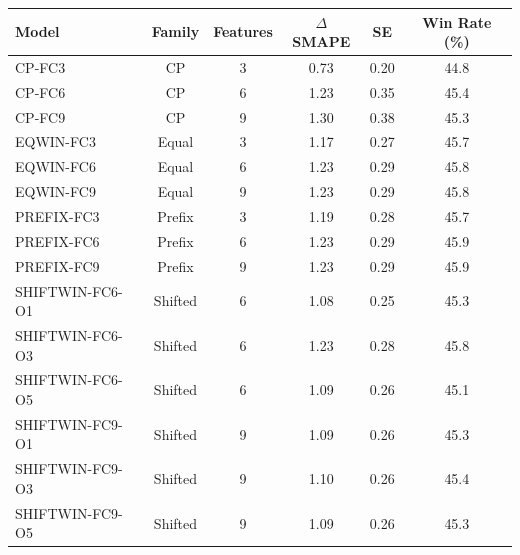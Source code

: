 \begin{tabular}{@{}lccccc@{}}
\toprule
Model & Family & Features & $\Delta$SMAPE & SE & Win Rate (\%) \\
\midrule
CP-FC3 & CP & 3 & 0.73 & 0.20 & 44.8 \\
CP-FC6 & CP & 6 & 1.23 & 0.35 & 45.4 \\
CP-FC9 & CP & 9 & 1.30 & 0.38 & 45.3 \\
EQWIN-FC3 & Equal & 3 & 1.17 & 0.27 & 45.7 \\
EQWIN-FC6 & Equal & 6 & 1.23 & 0.29 & 45.8 \\
EQWIN-FC9 & Equal & 9 & 1.23 & 0.29 & 45.8 \\
PREFIX-FC3 & Prefix & 3 & 1.19 & 0.28 & 45.7 \\
PREFIX-FC6 & Prefix & 6 & 1.23 & 0.29 & 45.9 \\
PREFIX-FC9 & Prefix & 9 & 1.23 & 0.29 & 45.9 \\
SHIFTWIN-FC6-O1 & Shifted & 6 & 1.08 & 0.25 & 45.3 \\
SHIFTWIN-FC6-O3 & Shifted & 6 & 1.23 & 0.28 & 45.8 \\
SHIFTWIN-FC6-O5 & Shifted & 6 & 1.09 & 0.26 & 45.1 \\
SHIFTWIN-FC9-O1 & Shifted & 9 & 1.09 & 0.26 & 45.3 \\
SHIFTWIN-FC9-O3 & Shifted & 9 & 1.10 & 0.26 & 45.4 \\
SHIFTWIN-FC9-O5 & Shifted & 9 & 1.09 & 0.26 & 45.3 \\
\bottomrule
\end{tabular}
